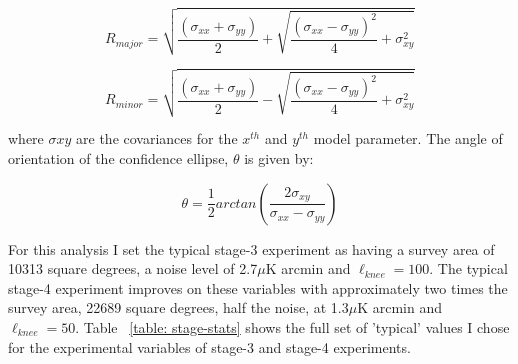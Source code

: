 \begin{equation}
R_{major} = \sqrt{\frac{(\sigma_{xx} + \sigma_{yy})}{2} + \sqrt{\frac{(\sigma_{xx} - \sigma_{yy})^2}{4} + \sigma_{xy}^2}}
\end{equation}

\begin{equation}
R_{minor} = \sqrt{\frac{(\sigma_{xx} + \sigma_{yy})}{2} - \sqrt{\frac{(\sigma_{xx} - \sigma_{yy})^2}{4} + \sigma_{xy}^2}}
\end{equation}

where $\sigma{xy}$ are the covariances for the $x^{th}$ and $y^{th}$ model parameter. The angle of orientation of the confidence ellipse, $\theta$ is given by:

\begin{equation}
\theta = \frac{1}{2}arctan(\frac{2\sigma_{xy}}{\sigma_{xx}-\sigma_{yy}})
\end{equation}

For this analysis I set the typical stage-3 experiment as having a survey area of 10313 square degrees, a noise level of 2.7$\mu$K arcmin and $\ell_{knee} = 100$. The typical stage-4 experiment improves on these variables with approximately two times the survey area, 22689 square degrees, half the noise, at 1.3$\mu$K arcmin and $\ell_{knee} = 50$. Table ~\ref{table: stage-stats} shows the full set of 'typical' values I chose for the experimental variables of stage-3 and stage-4 experiments.

